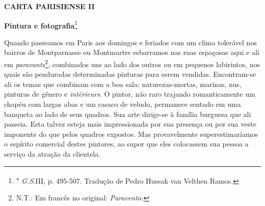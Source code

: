 \textbf{CARTA PARISIENSE II}

\textbf{Pintura e fotografia}\footnote{\textsuperscript{∗}
  \emph{G.S}.III, p. 495-507. Tradução de Pedro Hussak van Velthen
  Ramos.}

Quando passeamos em Paris aos domingos e feriados com um clima tolerável
nos bairros de Montparnasse ou Montmartre esbarramos nas ruas espaçosas
aqui e ali em \emph{paravants}\footnote{N.T.: Em francês no original:
  \emph{Paravento.}}, combinados uns ao lado dos outros ou em pequenos
labirintos, nos quais são penduradas determinadas pinturas para serem
vendidas. Encontram-se ali os temas que combinam com a boa sala:
naturezas-mortas, marinas, nus, pinturas de gênero e \emph{intérieurs}.
O pintor, não raro trajando romanticamente um chapéu com largas abas e
um casaco de veludo, permanece sentado em uma banqueta ao lado de seus
quadros. Sua arte dirige-se à família burguesa que ali passeia. Esta
talvez esteja mais impressionada por sua presença ou por sua veste
imponente do que pelos quadros expostos. Mas provavelmente
superestimaríamos o espírito comercial destes pintores, ao supor que
eles colocassem sua pessoa a serviço da atração da clientela.

